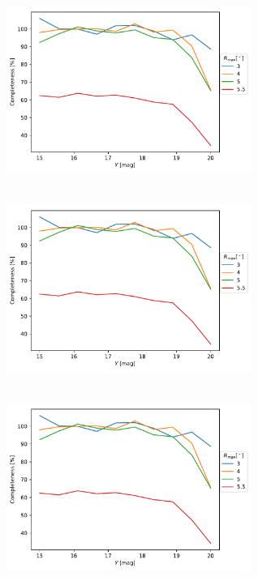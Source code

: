 \begin{figure}[ht!]
\begin{center}
    \begin{subfigure}[t]{0.49\textwidth}
        \includegraphics[page=1,height=6cm,width=8cm]{background/Figures/PhotoSpatialCompleteness_PDDR2.pdf}
    \end{subfigure}
    \begin{subfigure}[t]{0.49\textwidth}
      \includegraphics[page=2,height=6cm,width=8cm]{background/Figures/PhotoSpatialCompleteness_PDDR2.pdf}
    \end{subfigure}
     \begin{subfigure}[t]{0.49\textwidth}
      \includegraphics[page=3,height=6cm,width=8cm]{background/Figures/PhotoSpatialCompleteness_PDDR2.pdf}
    \end{subfigure}

\end{center}
\end{figure}
